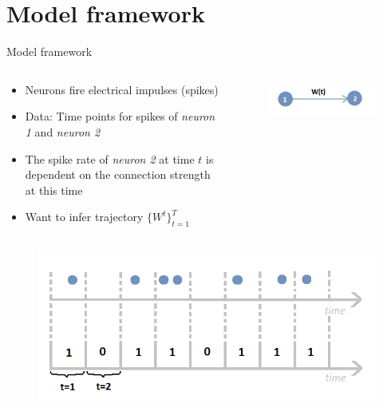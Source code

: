 \documentclass[aspectratio=169]{beamer}
\begin{document}
	
	\section{Model framework}
	\begin{frame}{Model framework}
	
	    \begin{columns}[totalwidth=\textwidth]
        \begin{column}{0.7\textwidth}
            	\begin{itemize}
	            \item Neurons fire electrical impulses (spikes)
	            \item Data: Time points for spikes of \textit{neuron 1} and \textit{neuron 2}
	            \item The spike rate of \textit{neuron 2} at time $t$ is dependent on the connection strength at this time
	            \item Want to infer trajectory $\{W^t\}_{t=1}^T$
	            \end{itemize}
        \end{column}
        \begin{column}{0.3\textwidth}
            \begin{figure}[H]
            \centering
            \includegraphics[scale=0.5]{Synapse.jpg}
            \vspace{-0.5cm}
            \end{figure}
        \end{column}
    \end{columns}

	\begin{columns}
	    \begin{column}{0.6 \textwidth}
	        \begin{figure}[]
            \includegraphics[scale=0.4, left]{Spike_train_illustration2.png}
            \vspace{-0.5cm}
            \end{figure}
        \end{column}
        

\end{columns}
\end{frame}
\end{document}
